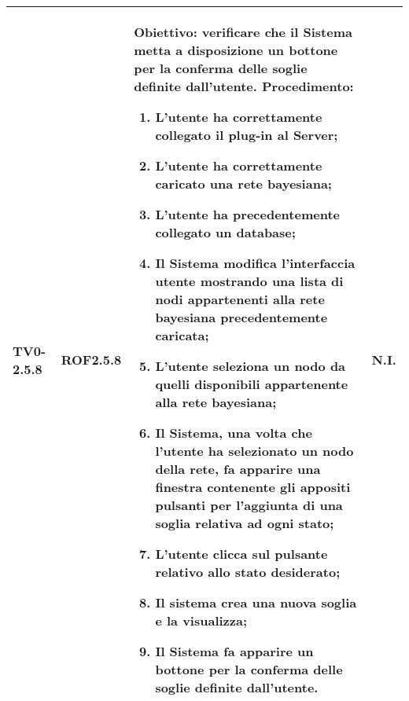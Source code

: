 \begin{longtable}{|C{.15\textwidth}|C{.13\textwidth}|m{.52\textwidth}|C{.08\textwidth}|}
TV0-2.5.8 & ROF2.5.8 &
	\textbf{Obiettivo}: verificare che il Sistema metta a disposizione un bottone per la conferma delle soglie definite dall'utente. \newline
	\textbf{Procedimento}:
	\begin{enumerate}
		\item L'utente ha correttamente collegato il plug-in al Server;
		\item L'utente ha correttamente caricato una rete bayesiana;
		\item L'utente ha precedentemente collegato un database;
		\item Il Sistema modifica l'interfaccia utente mostrando una lista di nodi appartenenti alla rete bayesiana precedentemente caricata;
		\item L'utente seleziona un nodo da quelli disponibili appartenente alla rete bayesiana;
		\item Il Sistema, una volta che l'utente ha selezionato un nodo della rete, fa apparire una finestra contenente gli appositi pulsanti per l'aggiunta di una soglia relativa ad ogni stato;
		\item L'utente clicca sul pulsante relativo allo stato desiderato;
		\item Il sistema crea una nuova soglia e la visualizza;
		\item Il Sistema fa apparire un bottone per la conferma delle soglie definite dall'utente.
	\end{enumerate}
	& N.I. \\
\hline


\end{longtable}
